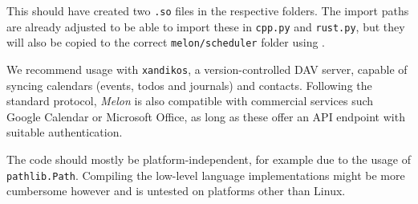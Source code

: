 This should have created two \texttt{.so} files in the respective folders.
The import paths are already adjusted to be able to import these in \texttt{cpp.py} and \texttt{rust.py}, but they will also be copied to the correct \texttt{melon/scheduler} folder using .

We recommend usage with \texttt{xandikos}, a version-controlled DAV server, capable of syncing calendars (events, todos and journals) and contacts.
Following the standard protocol, \textit{Melon} is also compatible with commercial services such Google Calendar or Microsoft Office, as long as these offer an API endpoint with suitable authentication.

The code should mostly be platform-independent, for example due to the usage of \texttt{pathlib.Path}. Compiling the low-level language implementations might be more cumbersome however and is untested on platforms other than Linux.
